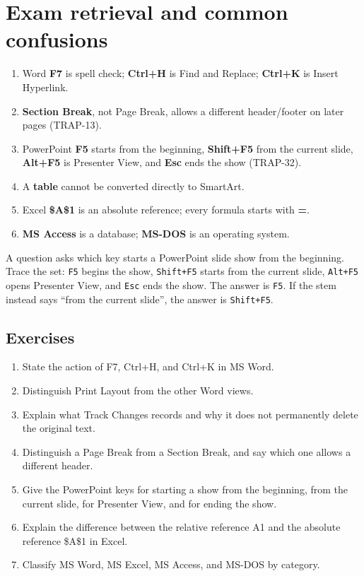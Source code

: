 \section{Exam retrieval and common confusions}
\begin{enumerate}
  \item Word \textbf{F7} is spell check; \textbf{Ctrl+H} is Find and Replace;
    \textbf{Ctrl+K} is Insert Hyperlink.
  \item \textbf{Section Break}, not Page Break, allows a different
    header/footer on later pages (TRAP-13).
  \item PowerPoint \textbf{F5} starts from the beginning, \textbf{Shift+F5}
    from the current slide, \textbf{Alt+F5} is Presenter View, and
    \textbf{Esc} ends the show (TRAP-32).
  \item A \textbf{table} cannot be converted directly to SmartArt.
  \item Excel \textbf{\$A\$1} is an absolute reference; every formula starts
    with \textbf{=}.
  \item \textbf{MS Access} is a database; \textbf{MS-DOS} is an operating
    system.
\end{enumerate}

\begin{example}
A question asks which key starts a PowerPoint slide show from the beginning.
Trace the set: \texttt{F5} begins the show, \texttt{Shift+F5} starts from the
current slide, \texttt{Alt+F5} opens Presenter View, and \texttt{Esc} ends the
show. The answer is \texttt{F5}. If the stem instead says ``from the current
slide'', the answer is \texttt{Shift+F5}.
\end{example}

\subsection*{Exercises}
\begin{enumerate}[label=\arabic*.]
  \item State the action of F7, Ctrl+H, and Ctrl+K in MS Word.
  \item Distinguish Print Layout from the other Word views.
  \item Explain what Track Changes records and why it does not permanently
    delete the original text.
  \item Distinguish a Page Break from a Section Break, and say which one
    allows a different header.
  \item Give the PowerPoint keys for starting a show from the beginning, from
    the current slide, for Presenter View, and for ending the show.
  \item Explain the difference between the relative reference A1 and the
    absolute reference \$A\$1 in Excel.
  \item Classify MS Word, MS Excel, MS Access, and MS-DOS by category.
\end{enumerate}

